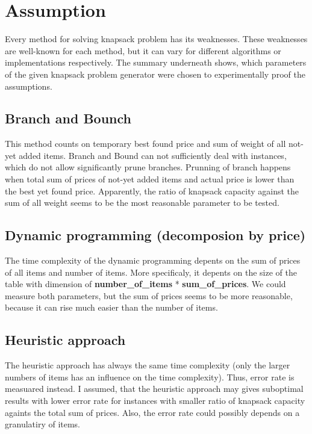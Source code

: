 \documentclass{article}
\begin{document}
\clearpage

\section{Assumption}
	Every method for solving knapsack problem has its weaknesses. These weaknesses are well-known for each method, but it can vary for different algorithms or implementations respectively. The summary underneath shows, which parameters of the given knapsack problem generator were chosen to experimentally proof the assumptions.

	\subsection{Branch and Bounch}
		This method counts on temporary best found price and sum of weight of all not-yet added items. Branch and Bound can not sufficiently deal with instances, which do not allow significantly prune branches. Prunning of branch happens when total sum of prices of not-yet added items and actual price is lower than the best yet found price. Apparently, the ratio of knapsack capacity against the sum of all weight seems to be the most reasonable parameter to be tested.
	\subsection{Dynamic programming (decomposion by price)}
		The time complexity of the dynamic programming depents on the sum of prices of all items and number of items. 
		More specificaly, it depents on the size of the table with dimension of \textbf{number\_of\_items} * \textbf{sum\_of\_prices}. We could measure both parameters, but the sum of prices seems to be more reasonable, because it can rise much easier than the number of items.
	\subsection{Heuristic approach}
		The heuristic approach has always the same time complexity (only the larger numbers of items has an influence on the time complexity). Thus, error rate is measuared instead. I assumed, that the heuristic approach may gives suboptimal results with lower error rate for instances with smaller ratio of knapsack capacity againts the total sum of prices. Also, the error rate could possibly depends on a granulatiry of items.
\end{document}
